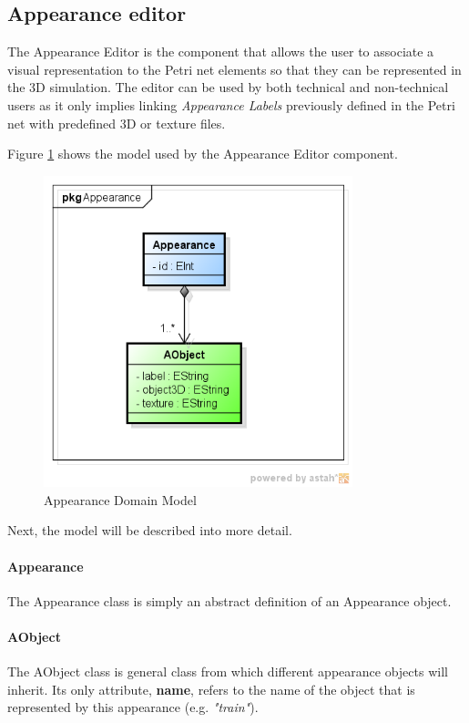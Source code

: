 \subsection{Appearance editor}

The Appearance Editor is the component that allows the user to associate a visual representation to the Petri net elements so that they can be represented in the 3D simulation. The editor can be used by both technical and non-technical users as it only implies linking \textit{Appearance Labels} previously defined in the Petri net with predefined 3D or texture files. 

Figure \ref{fig:appearance} shows the model used by the Appearance Editor component.

\begin{figure}[htp]
\begin{center}
  \includegraphics[width=0.8\textwidth]{image/appearance-model.png}
  \caption{Appearance Domain Model}
  \label{fig:appearance}
\end{center}
\end{figure}  

Next, the model will be described into more detail.

\paragraph{Appearance}
The Appearance class is simply an abstract definition of an Appearance object.

\paragraph{AObject}
The AObject class is general class from which different appearance objects will inherit. Its only attribute, \textbf{name}, refers to the name of the object that is represented by this appearance (e.g. \textit{"train"}).

